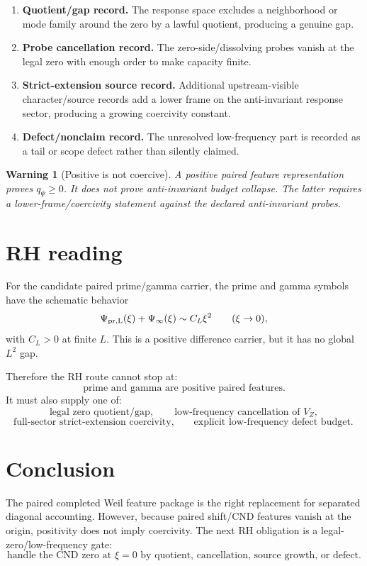 \documentclass[11pt]{article}
\newtheorem{warning}{Warning}
\begin{document}
\begin{enumerate}
\item \textbf{Quotient/gap record.} The response space excludes a neighborhood or mode family around the zero by a lawful quotient, producing a genuine gap.
\item \textbf{Probe cancellation record.} The zero-side/dissolving probes vanish at the legal zero with enough order to make capacity finite.
\item \textbf{Strict-extension source record.} Additional upstream-visible character/source records add a lower frame on the anti-invariant response sector, producing a growing coercivity constant.
\item \textbf{Defect/nonclaim record.} The unresolved low-frequency part is recorded as a tail or scope defect rather than silently claimed.
\end{enumerate}

\begin{warning}[Positive is not coercive]
A positive paired feature representation proves $q_\Psi\ge0$. It does not prove anti-invariant budget collapse. The latter requires a lower-frame/coercivity statement against the declared anti-invariant probes.
\end{warning}

\section{RH reading}
For the candidate paired prime/gamma carrier, the prime and gamma symbols have the schematic behavior
\[
  \Psi_{\rm pr,L}(\xi)+\Psi_\infty(\xi)
  \sim C_L\xi^2
  \qquad (\xi\to0),
\]
with $C_L>0$ at finite $L$. This is a positive difference carrier, but it has no global $L^2$ gap.

Therefore the RH route cannot stop at:
\[
  \text{prime and gamma are positive paired features.}
\]
It must also supply one of:
\[
  \text{legal zero quotient/gap},\qquad
  \text{low-frequency cancellation of }V_Z,
\]
\[
  \text{full-sector strict-extension coercivity},\qquad
  \text{explicit low-frequency defect budget.}
\]

\section{Conclusion}
The paired completed Weil feature package is the right replacement for separated diagonal accounting. However, because paired shift/CND features vanish at the origin, positivity does not imply coercivity. The next RH obligation is a legal-zero/low-frequency gate:
\[
  \boxed{\text{handle the CND zero at }\xi=0\text{ by quotient, cancellation, source growth, or defect.}}
\]
\end{document}
